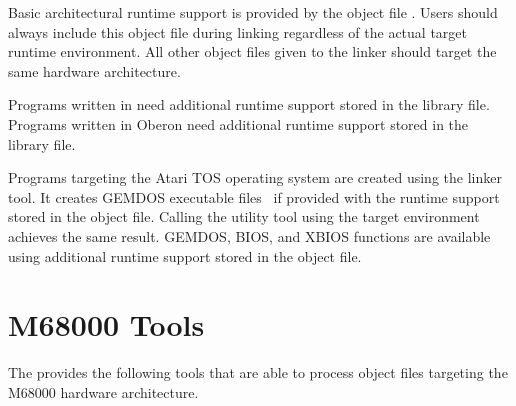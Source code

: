 Basic architectural runtime support is provided by the object file .
Users should always include this object file during linking regardless of the actual target runtime environment.
All other object files given to the linker should target the same hardware architecture.

Programs written in \cpp{} need additional runtime support stored in the  library file.
Programs written in Oberon need additional runtime support stored in the  library file.
\seecpp\seeoberon

Programs targeting the Atari TOS operating system are created using the  linker tool.
It creates GEMDOS executable files~\cite{gemdosfile} if provided with the runtime support stored in the  object file.
Calling the  utility tool using the  target environment achieves the same result.
GEMDOS, BIOS, and XBIOS functions are available using additional runtime support stored in the  object file.

\section{M68000 Tools}

The \ecs{} provides the following tools that are able to process object files targeting the M68000 hardware architecture.
\interface

\cdmabk
\cppmabk
\falmabk
\obmabk
\mabkasm
\mabkdism
\linkprg

\concludechapter
